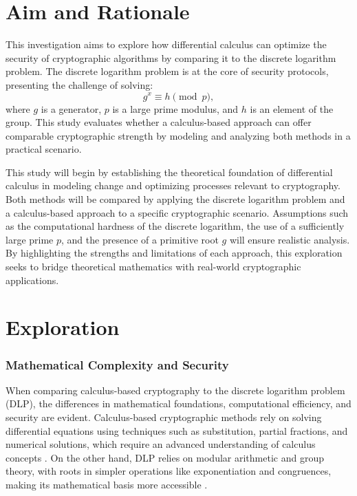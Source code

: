 \documentclass[12pt]{article}
\begin{document}
\section*{Aim and Rationale}

This investigation aims to explore how differential calculus can optimize the security of cryptographic algorithms by comparing it to the discrete logarithm problem. The discrete logarithm problem is at the core of security protocols, presenting the challenge of solving:
\[
g^x \equiv h \pmod{p},
\]
where \( g \) is a generator, \( p \) is a large prime modulus, and \( h \) is an element of the group. This study evaluates whether a calculus-based approach can offer comparable cryptographic strength by modeling and analyzing both methods in a practical scenario.

This study will begin by establishing the theoretical foundation of differential calculus in modeling change and optimizing processes relevant to cryptography. Both methods will be compared by applying the discrete logarithm problem and a calculus-based approach to a specific cryptographic scenario. Assumptions such as the computational hardness of the discrete logarithm, the use of a sufficiently large prime \( p \), and the presence of a primitive root \( g \) will ensure realistic analysis. By highlighting the strengths and limitations of each approach, this exploration seeks to bridge theoretical mathematics with real-world cryptographic applications.





\section*{Exploration}

\subsubsection*{Mathematical Complexity and Security}
When comparing calculus-based cryptography to the discrete logarithm problem (DLP), the differences in mathematical foundations, computational efficiency, and security are evident. Calculus-based cryptographic methods rely on solving differential equations using techniques such as substitution, partial fractions, and numerical solutions, which require an advanced understanding of calculus concepts \cite{Stewart2016}. On the other hand, DLP relies on modular arithmetic and group theory, with roots in simpler operations like exponentiation and congruences, making its mathematical basis more accessible \cite{Trappe2006}.
\end{document}

